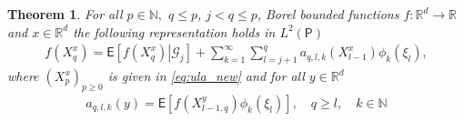 \documentclass[bj]{imsart}
\def\nset{\mathbb{N}}
\def\rset{\mathbb{R}}
\def\rset{\mathbb{R}}
\newtheorem{thm}{Theorem}
\begin{document}
\begin{thm}\label{prop:29032018a1}
For all $p \in \nset,$ $q \leq p$, $j < q \leq p$, Borel bounded functions $f: \rset^d \rightarrow \rset$ and $x \in \rset^d$ the following representation holds in \(L^2(\mathsf{P})\)
\begin{eqnarray}
\label{eq:mart_repr}
f(X^x_{q})=\mathsf{E}\left[\left.f(X^x_{q})\right|\mathcal G_{j}\right]+\sum_{k=1}^{\infty}\sum_{l=j+1}^{q}a_{q,l,k}(X^x_{l-1})\phi_k\left(\xi_{l}\right),
\end{eqnarray}
where \((X^x_{p})_{p\geq 0}\) is given in \eqref{eq:ula_new} and for all $y \in \rset^d$
\begin{eqnarray}
\label{eq:coeff_mart}
a_{q,l,k}(y)=\mathsf{E}\left[f(X^y_{l-1,q})\phi_k\left(\xi_{l}\right)\right], \quad q\geq l, \quad k\in \nset
\end{eqnarray}
\end{thm}
\end{document}
